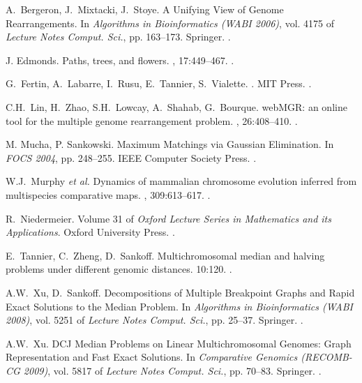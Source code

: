 \documentclass[10pt]{llncs}
\begin{document}
\begin{thebibliography}{10} \label{bibliography}

  A.~Bergeron, J.~Mixtacki, J.~Stoye.
  \newblock A Unifying View of Genome Rearrangements.
  \newblock In {\em Algorithms in Bioinformatics (WABI 2006)}, vol. 4175 of {\em Lecture Notes Comput. Sci.}, pp. 163--173.
  \newblock Springer.
  .

  J. Edmonds.
  \newblock Paths, trees, and flowers.
  , 17:449--467.
  .

  G.~Fertin, A.~Labarre, I.~Rusu, E.~Tannier, S.~Vialette.
  .
  \newblock MIT Press.
  . 
  
  C.H.~Lin, H.~Zhao, S.H.~Lowcay, A.~Shahab, G.~Bourque.
  \newblock webMGR: an online tool for the multiple genome rearrangement problem.
  , 26:408--410.
  .
    
  M. Mucha, P. Sankowski.
  \newblock Maximum Matchings via Gaussian Elimination.
  \newblock In {\em FOCS 2004}, pp. 248--255.
  \newblock IEEE Computer Society Press.
  .
  
  W.J.~Murphy {\em et al.}
  \newblock Dynamics of mammalian chromosome evolution inferred from multispecies comparative maps.
  , 309:613--617. 
  .

  R.~Niedermeier.
  \newblock Volume 31 of {\em Oxford Lecture Series in Mathematics and its Applications}.
  \newblock Oxford University Press.
  .



  E.~Tannier, C.~Zheng, D.~Sankoff.
  \newblock Multichromosomal median and halving problems under different genomic distances.
   10:120. 
  .

  A.W.~Xu, D.~Sankoff.
  \newblock Decompositions of Multiple Breakpoint Graphs and Rapid Exact Solutions to the Median Problem.
  \newblock In {\em Algorithms in Bioinformatics (WABI 2008)}, vol. 5251 of {\em Lecture Notes Comput. Sci.}, pp. 25--37.
  \newblock Springer.
  .

  A.W.~Xu.
  \newblock DCJ Median Problems on Linear Multichromosomal Genomes: Graph Representation and Fast Exact Solutions.
  \newblock In {\em Comparative Genomics (RECOMB-CG 2009)}, vol. 5817 of {\em Lecture Notes Comput. Sci.}, pp. 70--83.
  \newblock Springer.
  .


\end{thebibliography}
\end{document}
